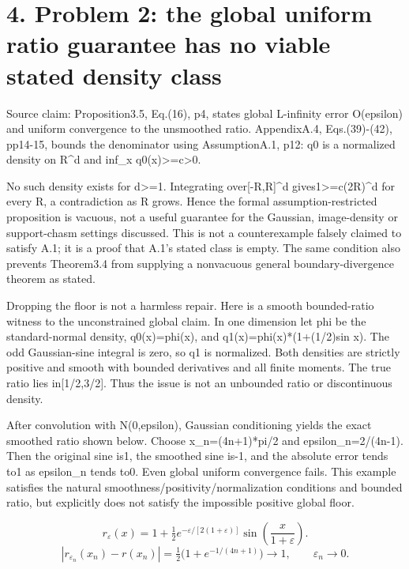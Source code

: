 \documentclass[10pt]{article}
\begin{document}
\section*{4. Problem 2: the global uniform ratio guarantee has no viable stated density class}
Source claim: Proposition3.5, Eq.(16), p4, states global L-infinity error O(epsilon) and uniform convergence to the unsmoothed ratio. AppendixA.4, Eqs.(39)-(42), pp14-15, bounds the denominator using AssumptionA.1, p12: q0 is a normalized density on R\textasciicircum{}d and inf\_x q0(x)>=c>0.\par
No such density exists for d>=1. Integrating over[-R,R]\textasciicircum{}d gives1>=c(2R)\textasciicircum{}d for every R, a contradiction as R grows. Hence the formal assumption-restricted proposition is vacuous, not a useful guarantee for the Gaussian, image-density or support-chasm settings discussed. This is not a counterexample falsely claimed to satisfy A.1; it is a proof that A.1’s stated class is empty. The same condition also prevents Theorem3.4 from supplying a nonvacuous general boundary-divergence theorem as stated.\par
Dropping the floor is not a harmless repair. Here is a smooth bounded-ratio witness to the unconstrained global claim. In one dimension let phi be the standard-normal density, q0(x)=phi(x), and q1(x)=phi(x)*(1+(1/2)sin x). The odd Gaussian-sine integral is zero, so q1 is normalized. Both densities are strictly positive and smooth with bounded derivatives and all finite moments. The true ratio lies in[1/2,3/2]. Thus the issue is not an unbounded ratio or discontinuous density.\par
After convolution with N(0,epsilon), Gaussian conditioning yields the exact smoothed ratio shown below. Choose x\_n=(4n+1)*pi/2 and epsilon\_n=2/(4n-1). Then the original sine is1, the smoothed sine is-1, and the absolute error tends to1 as epsilon\_n tends to0. Even global uniform convergence fails. This example satisfies the natural smoothness/positivity/normalization conditions and bounded ratio, but explicitly does not satisfy the impossible positive global floor.\par
\[r_\varepsilon(x)=1+\tfrac12 e^{-\varepsilon/[2(1+\varepsilon)]}\sin\!\left(\frac{x}{1+\varepsilon}\right).\] \[|r_{\varepsilon_n}(x_n)-r(x_n)|=\tfrac12\bigl(1+e^{-1/(4n+1)}\bigr)\longrightarrow1,\qquad\varepsilon_n\longrightarrow0.\]\par
\end{document}
